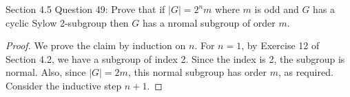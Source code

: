 Section 4.5 Question 49: Prove that if $|G|=2^nm$ where $m$ is odd and $G$
has a cyclic Sylow 2-subgroup then $G$ has a nromal subgroup of order $m$.

\begin{proof}
  We prove the claim by induction on $n$. For $n=1$, by Exercise 12 of
  Section 4.2, we have a subgroup of index 2. Since the index is 2, the
  subgroup is normal. Also, since $|G|=2m$, this normal subgroup has order
  $m$, as required. \\

  Consider the inductive step $n+1$.
\end{proof}
